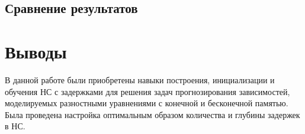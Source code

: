 
\subsection{Сравнение результатов}


\section{Выводы}

В данной работе были приобретены навыки построения, инициализации и обучения НС с задержками для решения задач прогнозирования зависимостей, моделируемых разностными уравнениями с конечной и бесконечной памятью. Была проведена настройка оптимальным образом количества и глубины задержек в НС.


